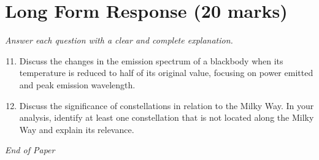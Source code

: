 \documentclass[12pt]{article}
\begin{document}
\section*{Long Form Response (20 marks)}
\textit{Answer each question with a clear and complete explanation.}
\begin{enumerate}[label=\arabic*.]
\setcounter{enumi}{10}
\item Discuss the changes in the emission spectrum of a blackbody when its temperature is reduced to half of its original value, focusing on power emitted and peak emission wavelength.
\item Discuss the significance of constellations in relation to the Milky Way. In your analysis, identify at least one constellation that is not located along the Milky Way and explain its relevance.
\end{enumerate}

\vfill
\noindent\textit{End of Paper}
\end{document}
